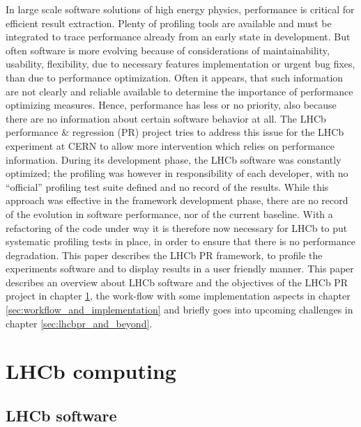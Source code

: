 \documentclass[a4paper]{jpconf}
\begin{document}
In large scale software solutions of high energy physics, performance is critical for efficient result extraction. Plenty of profiling tools are available and must be integrated to trace performance already from an early state in development. But often software is more evolving because of considerations of maintainability, usability, flexibility, due to necessary features implementation or urgent bug fixes, than due to performance optimization. Often it appears, that such information are not clearly and reliable available to determine the importance of performance optimizing measures. Hence, performance has less or no priority, also because there are no information about certain software behavior at all. The LHCb performance \& regression (PR) project tries to address this issue for the LHCb experiment at CERN to allow more intervention which relies on performance information.    
\newline
During its development phase, the LHCb software was constantly optimized; the profiling was however in responsibility of each developer, with no ``official'' profiling test suite defined and no record of the results. While this approach was effective in the framework development phase, there are no record of the evolution in software performance, nor of the current baseline. With a refactoring of the code under way it is therefore now necessary for LHCb to put systematic profiling tests in place, in order to ensure that there is no performance degradation.
\newline
This paper describes the LHCb PR framework, to profile the experiments software and to display results in a user friendly manner. This paper describes an overview about LHCb software and the objectives of the LHCb PR project in chapter \ref{sec:lhcb_computing}, the work-flow with some implementation aspects in chapter \ref{sec:workflow_and_implementation} and briefly goes into upcoming challenges in chapter \ref{sec:lhcbpr_and_beyond}.

\section{LHCb computing}
\label{sec:lhcb_computing}

\subsection{LHCb software}
\label{sec:lhcb_software}
\end{document}
